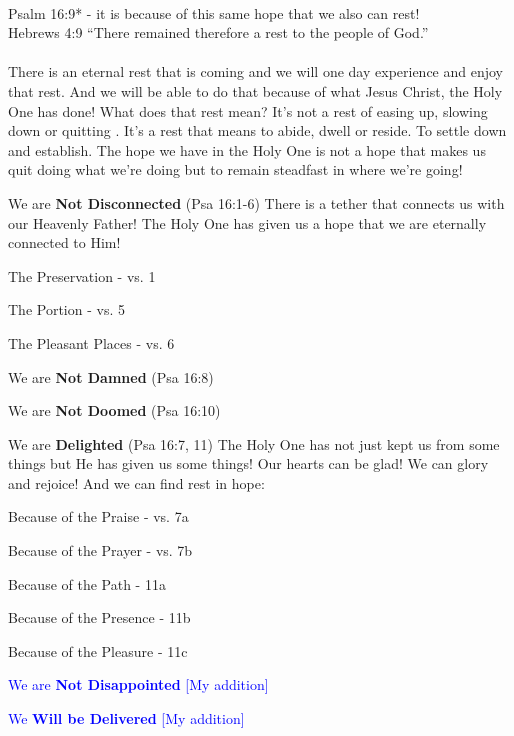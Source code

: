 \\
Psalm 16:9* - it is because of this same hope that we also can rest!\\
Hebrews 4:9 “There remained therefore a rest to the people of God.”\\
\\
There is an eternal rest that is coming and we will one day experience and enjoy that rest. And we will be able to do that because of what Jesus Christ, the Holy One has done! What does that rest mean? It’s not a rest of easing up, slowing down or quitting . It’s a rest that means to abide, dwell or reside. To settle down and establish. The hope we have in the Holy One is not a hope that makes us quit doing what we’re doing but to remain steadfast in where we’re going!\\

\begin{compactenum}[I.][8]
	\item We are \textbf{Not Disconnected}  (Psa 16:1-6) There is a tether that connects us with our Heavenly Father! 
The Holy One has given us a hope that we are eternally connected to Him!
	\begin{compactenum}[A.][8]
	    \item The Preservation - vs. 1
 	    \item The Portion - vs. 5 
 	    \item The Pleasant Places - vs. 6
    \end{compactenum}
	\item We are \textbf{Not Damned}  (Psa 16:8)
	\item We are \textbf{Not Doomed}  (Psa 16:10)
	\item We are \textbf{Delighted}  (Psa 16:7, 11) The Holy One has not just kept us from some things but He has given us some things! 
Our hearts can be glad! We can glory and rejoice! And we can find rest in hope:
	\begin{compactenum}[A.][8]
	    \item Because of the Praise - vs. 7a
	    \item Because of the Prayer - vs. 7b
	    \item Because of the Path - 11a
	    \item Because of the Presence - 11b
	    \item Because of the Pleasure - 11c
    \end{compactenum}
	\item \textcolor{blue}{We are \textbf{Not Disappointed} [My addition]}
	\item \textcolor{blue}{We  \textbf{Will be Delivered} [My addition]}
\end{compactenum}


